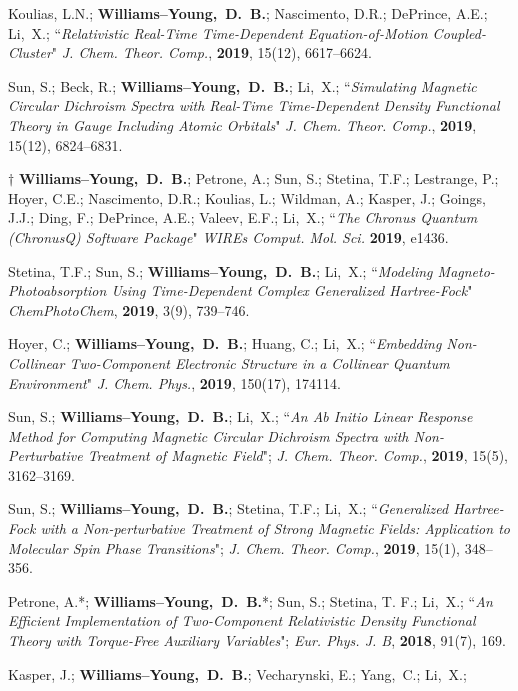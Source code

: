 \documentclass[10pt]{res} %
\newcommand*\me[0]{{\bf Williams--Young,~D.~B.}}
\newcommand*\xsli[0]{Li,~X.}
\newcommand*\cy[0]{Yang,~C.}
\begin{document}
\begin{resume}
\begin{etaremune}
  \item Koulias, L.N.; \me; Nascimento, D.R.; DePrince, A.E.; \xsli;
        ``\emph{Relativistic Real-Time Time-Dependent Equation-of-Motion Coupled-Cluster}"
        \emph{J. Chem. Theor. Comp.}, \textbf{2019}, 15(12), 6617--6624.
  \item Sun, S.; Beck, R.; \me; \xsli;
        ``\emph{Simulating Magnetic Circular Dichroism Spectra with Real-Time Time-Dependent
          Density Functional Theory in Gauge Including Atomic Orbitals}"
        \emph{J. Chem. Theor. Comp.}, \textbf{2019}, 15(12), 6824--6831.
  \item $\dagger$ \me; Petrone, A.; Sun, S.; Stetina, T.F.; Lestrange, P.; Hoyer, C.E.; 
        Nascimento, D.R.; Koulias, L.; Wildman, A.; Kasper, J.; Goings, J.J.; 
        Ding, F.; DePrince, A.E.; Valeev, E.F.; \xsli;
        ``\emph{The Chronus Quantum (ChronusQ) Software Package}"
        \emph{WIREs Comput. Mol. Sci.} \textbf{2019}, e1436.
  \item Stetina, T.F.; Sun, S.; \me; \xsli;
        ``\emph{Modeling Magneto-Photoabsorption Using Time-Dependent Complex 
          Generalized Hartree-Fock}"
        \emph{ChemPhotoChem}, \textbf{2019}, 3(9), 739--746.
  \item Hoyer, C.; \me; Huang, C.; \xsli;
        ``\emph{Embedding Non-Collinear Two-Component Electronic Structure in 
          a Collinear Quantum Environment}"
        \emph{J. Chem. Phys.}, \textbf{2019}, 150(17), 174114.
  \item Sun, S.; \me; \xsli;
        ``\emph{An Ab Initio Linear Response Method for Computing Magnetic 
          Circular Dichroism Spectra with Non-Perturbative Treatment of 
          Magnetic Field}";
        \emph{J. Chem. Theor. Comp.}, \textbf{2019}, 15(5), 3162--3169.
  \item Sun, S.; \me; Stetina, T.F.; \xsli;
        ``\emph{Generalized Hartree-Fock with a Non-perturbative Treatment 
          of Strong Magnetic Fields: Application to Molecular Spin Phase 
          Transitions}";
        \emph{J. Chem. Theor. Comp.}, \textbf{2019}, 15(1), 348--356.
  \item Petrone, A.*; \me*; Sun, S.; Stetina, T. F.; \xsli;
        ``\emph{An Efficient Implementation of Two-Component Relativistic 
	  Density Functional Theory with Torque-Free Auxiliary Variables}";
	\emph{Eur. Phys. J. B}, \textbf{2018}, 91(7), 169.
  \item Kasper, J.; \me; Vecharynski, E.; \cy; \xsli;

\end{etaremune}
\end{resume}
\end{document}
